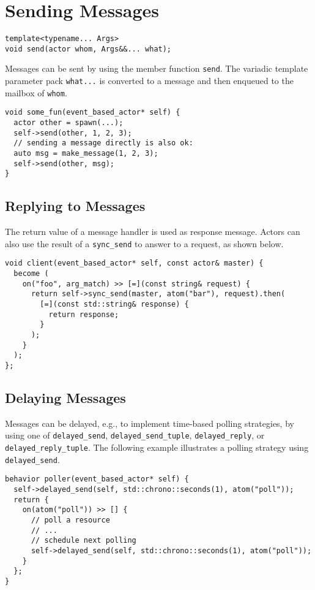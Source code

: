 \section{Sending Messages}
\label{Sec::Send}

\begin{lstlisting}
template<typename... Args>
void send(actor whom, Args&&... what);
\end{lstlisting}

Messages can be sent by using the member function \lstinline^send^.
The variadic template parameter pack \lstinline^what...^ is converted to a message and then enqueued to the mailbox of \lstinline^whom^.

\begin{lstlisting}
void some_fun(event_based_actor* self) {
  actor other = spawn(...);
  self->send(other, 1, 2, 3);
  // sending a message directly is also ok:
  auto msg = make_message(1, 2, 3);
  self->send(other, msg);
}
\end{lstlisting}

\clearpage
\subsection{Replying to Messages}
\label{Sec::Send::Reply}

The return value of a message handler is used as response message.
Actors can also use the result of a \lstinline^sync_send^ to answer to a request, as shown below.

\begin{lstlisting}
void client(event_based_actor* self, const actor& master) {
  become (
    on("foo", arg_match) >> [=](const string& request) {
      return self->sync_send(master, atom("bar"), request).then(
        [=](const std::string& response) {
          return response;
        }
      );
    }
  );
};
\end{lstlisting}

\subsection{Delaying Messages}

Messages can be delayed, e.g., to implement time-based polling strategies, by using one of \lstinline^delayed_send^, \lstinline^delayed_send_tuple^, \lstinline^delayed_reply^, or \lstinline^delayed_reply_tuple^.
The following example illustrates a polling strategy using \lstinline^delayed_send^.

\begin{lstlisting}
behavior poller(event_based_actor* self) {
  self->delayed_send(self, std::chrono::seconds(1), atom("poll"));
  return {
    on(atom("poll")) >> [] {
      // poll a resource
      // ...
      // schedule next polling
      self->delayed_send(self, std::chrono::seconds(1), atom("poll"));
    }
  };
}
\end{lstlisting}

